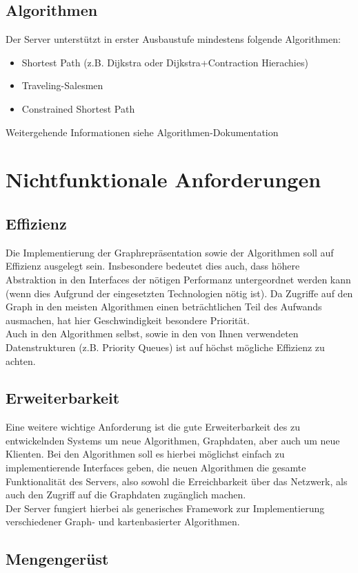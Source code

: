 \documentclass[a4paper,10pt,titlepage,parskip=true]{article}
\begin{document}
\subsection{Algorithmen}
Der Server unterstützt in erster Ausbaustufe mindestens folgende Algorithmen:
\begin{itemize}
 \item Shortest Path (z.B. Dijkstra oder Dijkstra+Contraction Hierachies)
 \item Traveling-Salesmen
 \item Constrained Shortest Path
\end{itemize}

Weitergehende Informationen siehe Algorithmen-Dokumentation 

\section{Nichtfunktionale Anforderungen}
\subsection{Effizienz}
Die Implementierung der Graphrepräsentation sowie der Algorithmen soll auf Effizienz ausgelegt sein.
Insbesondere bedeutet dies auch, dass höhere Abstraktion in den Interfaces der nötigen Performanz
untergeordnet werden kann (wenn dies Aufgrund der eingesetzten Technologien nötig ist). Da Zugriffe auf den Graph in den meisten Algorithmen einen beträchtlichen Teil des Aufwands ausmachen, hat hier
Geschwindigkeit besondere Priorität.\\
Auch in den Algorithmen selbst, sowie in den von Ihnen verwendeten Datenstrukturen (z.B. Priority Queues) ist auf höchst mögliche Effizienz zu achten.
\subsection{Erweiterbarkeit}
Eine weitere wichtige Anforderung ist die gute Erweiterbarkeit des zu entwickelnden Systems um neue Algorithmen, Graphdaten, aber auch um neue Klienten.
Bei den Algorithmen soll es hierbei möglichst einfach zu implementierende Interfaces geben, die neuen Algorithmen die gesamte Funktionalität des Servers,
also sowohl die Erreichbarkeit über das Netzwerk, als auch den Zugriff auf die Graphdaten zugänglich machen.\\
Der Server fungiert hierbei als generisches Framework zur Implementierung verschiedener Graph- und kartenbasierter Algorithmen.
\subsection{Mengengerüst}
\label{Mengengeruest}
\end{document}
